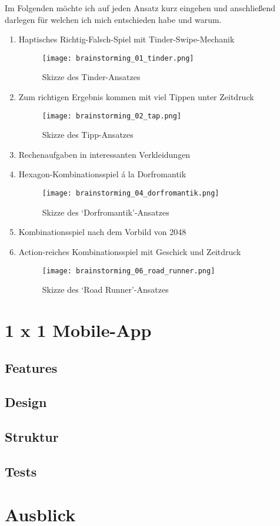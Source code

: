 Im Folgenden möchte ich auf jeden Ansatz kurz eingehen und anschließend darlegen für welchen ich mich entschieden habe und warum.

\begin{enumerate}
  \item Haptisches Richtig-Falsch-Spiel mit Tinder-Swipe-Mechanik
  
  \begin{figure}[h]
    \centering
    \texttt{[image: brainstorming\_01\_tinder.png]}
    \caption{Skizze des Tinder-Ansatzes}
  \end{figure}

  \item Zum richtigen Ergebnis kommen mit viel Tippen unter Zeitdruck
  
  \begin{figure}[h]
    \centering
    \texttt{[image: brainstorming\_02\_tap.png]}
    \caption{Skizze des Tipp-Ansatzes}
  \end{figure}

  \item Rechenaufgaben in interessanten Verkleidungen
  \item Hexagon-Kombinationsspiel á la Dorfromantik
  
  \begin{figure}[h]
    \centering
    \texttt{[image: brainstorming\_04\_dorfromantik.png]}
    \caption{Skizze des \enquote*{Dorfromantik}-Ansatzes}
  \end{figure}

  \item Kombinationsspiel nach dem Vorbild von 2048
  \item Action-reiches Kombinationsspiel mit Geschick und Zeitdruck
  
  \begin{figure}[h]
    \centering
    \texttt{[image: brainstorming\_06\_road\_runner.png]}
    \caption{Skizze des \enquote*{Road Runner}-Ansatzes}
  \end{figure}
\end{enumerate}

\section{1 x 1 Mobile-App}

\subsection{Features}

\subsection{Design}

\subsection{Struktur}

\subsection{Tests}

\section{Ausblick}
